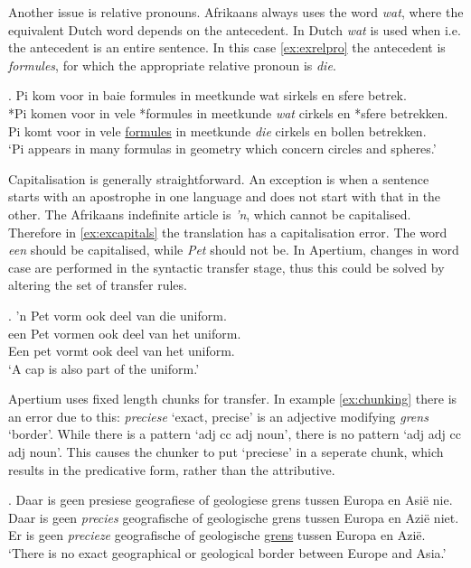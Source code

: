 \documentclass[11pt]{article}
\begin{document}
Another issue is relative pronouns. Afrikaans always uses the word {\em wat}, where the equivalent
Dutch word depends on the antecedent. In Dutch {\em wat} is used when i.e. the antecedent
is an entire sentence. In this case \ref{ex:exrelpro} the antecedent is {\em formules}, for 
which the appropriate relative pronoun is {\em die}. 

\ex. \label{ex:exrelpro}
    Pi kom voor in baie formules in meetkunde wat sirkels en sfere betrek. \\
    *Pi komen voor in vele *formules in meetkunde {\em wat} cirkels en *sfere betrekken. \\
    Pi komt voor in vele \underline{formules} in meetkunde {\em die} cirkels en bollen betrekken. \\
    `Pi appears in many formulas in geometry which concern circles and spheres.' 

Capitalisation is generally straightforward. An exception is when a sentence
starts with an apostrophe in one language and does not start with that in the other. The Afrikaans
indefinite article is \emph{'n}, which cannot be capitalised. Therefore in \ref{ex:excapitals} the translation has a 
capitalisation error. The word \emph{een} should be capitalised, while \emph{Pet} should not 
be. In Apertium, changes in word case are performed in the syntactic transfer stage, thus this 
could be solved by altering the set of transfer rules.

\ex. \label{ex:excapitals} 
    'n Pet vorm ook deel van die uniform. \\
    een Pet vormen ook deel van het uniform. \\
    Een pet vormt ook deel van het uniform. \\
    `A cap is also part of the uniform.' 

Apertium uses fixed length chunks for transfer. In example \ref{ex:chunking} there is an error
due to this: \emph{preciese} `exact, precise' is an adjective modifying \emph{grens} `border'. While 
there is a pattern
`adj cc adj noun', there is no pattern `adj adj cc adj noun'. This causes the chunker to put
`preciese' in a seperate chunk, which results in the predicative form, rather than the attributive.

\ex. \label{ex:chunking}
    Daar is geen presiese geografiese of geologiese grens tussen Europa en Asië nie. \\
    Daar is geen {\em precies} geografische of geologische grens tussen Europa en Azië niet. \\ 
    Er is geen {\em precieze} geografische of geologische \underline{grens} tussen Europa en Azië. \\
    `There is no exact geographical or geological border between Europe and Asia.' 
\end{document}
